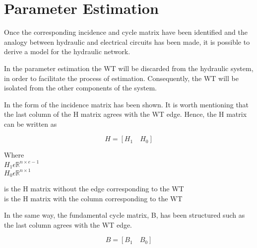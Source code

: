 \section{Parameter Estimation}  
\label{ParameterEstimation}
Once the corresponding incidence and cycle matrix have been identified and the analogy between hydraulic and
electrical circuits has been made, it is possible to derive a model for the hydraulic network. 

In the parameter estimation the WT will be discarded from the hydraulic system, 
in order to facilitate the process of estimation. Consequently, the WT will be isolated from the other components of the
system.  



In  the form of the incidence matrix has been shown. It is worth mentioning that the last column of the H matrix agrees with the WT edge. Hence, the H matrix can be written as 

\begin {equation}
H = [H_1 \quad H_0]
\label{Hmatrix}
\end{equation}

\begin{minipage}[t]{0.20\textwidth}
Where\\
\hspace*{8mm} $H_1 \epsilon \mathbb{R}^{n \times e-1}$  \\
\hspace*{8mm} $H_0 \epsilon \mathbb{R}^{n \times 1} $ 
\end{minipage}
\begin{minipage}[t]{0.68\textwidth}
\vspace*{2mm}
\hspace*{4mm} is the H matrix without the edge corresponding to the WT\\
\hspace*{4mm} is the H matrix with the column corresponding to the WT 
\end{minipage}

In the same way, the fundamental cycle matrix, B, has been structured such as the last column agrees with the WT edge.

\begin{equation}
  B = [B_1 \quad B_0]
\end{equation} 

